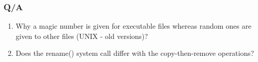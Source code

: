 \begin{frame}
    \frametitle{Q/A}
    \begin{enumerate}
      \item Why a magic number is given for executable files whereas random ones are given to other files (UNIX - old versions)?
      \item Does the rename() system call differ with the copy-then-remove operations?
    \end{enumerate}
\end{frame}
